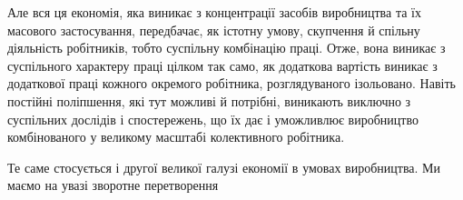 Але вся ця економія, яка виникає з концентрації засобів виробництва
та їх масового застосування, передбачає, як істотну
умову, скупчення й спільну діяльність робітників, тобто суспільну
комбінацію праці. Отже, вона виникає з суспільного характеру
праці цілком так само, як додаткова вартість виникає
з додаткової праці кожного окремого робітника, розглядуваного
ізольовано. Навіть постійні поліпшення, які тут можливі й потрібні,
виникають виключно з суспільних дослідів і спостережень,
що їх дає і уможливлює виробництво комбінованого у
великому масштабі колективного робітника.

Те саме стосується і другої великої галузі економії в умовах
виробництва. Ми маємо на увазі зворотне перетворення
\parbreak{}  %
